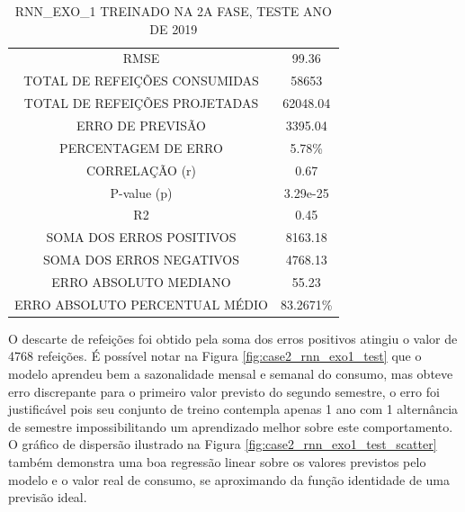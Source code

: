       
        \begin{table}[!h]
            \centering
            \caption{RNN\_EXO\_1 TREINADO NA 2A FASE, TESTE ANO DE 2019}
            \label{table:case2_rnn_exo_2_2019}
                \begin{tabular}{c|c}
                \rowcolor{gray!50}
                \hline
                \multicolumn{2}{c}{RNN\_EXO\_1 TREINADO NA 2A FASE, TESTE ANO DE 2019}\\ \hline
                RMSE & 99.36\\
                TOTAL DE REFEIÇÕES CONSUMIDAS & 58653 \\
                TOTAL DE REFEIÇÕES PROJETADAS & 62048.04\\
                ERRO DE PREVISÃO & 3395.04 \\
                PERCENTAGEM DE ERRO & 5.78\%  \\
                CORRELAÇÃO (r)& 0.67 \\
                P-value (p) & 3.29e-25\\
                R2 & 0.45\\
                SOMA DOS ERROS POSITIVOS & 8163.18\\
                SOMA DOS ERROS NEGATIVOS & 4768.13\\
                ERRO ABSOLUTO MEDIANO & 55.23\\
                ERRO ABSOLUTO PERCENTUAL MÉDIO & 83.2671\% \\ \hline
            \end{tabular}
            \end{table}

    \newpage
     O descarte de refeições foi obtido pela soma dos erros positivos atingiu o valor de 4768 refeições.
     É possível notar na Figura \ref{fig:case2_rnn_exo1_test} que o modelo aprendeu bem a sazonalidade mensal e semanal do consumo, mas obteve erro discrepante para o primeiro valor previsto do segundo semestre, o erro foi justificável pois seu conjunto de treino contempla apenas 1 ano com 1 alternância de semestre impossibilitando um aprendizado melhor sobre este comportamento.
     O gráfico de dispersão ilustrado na Figura \ref{fig:case2_rnn_exo1_test_scatter} também demonstra uma boa regressão linear sobre os valores previstos pelo modelo e o valor real de consumo, se aproximando da função identidade de uma previsão ideal.
     
